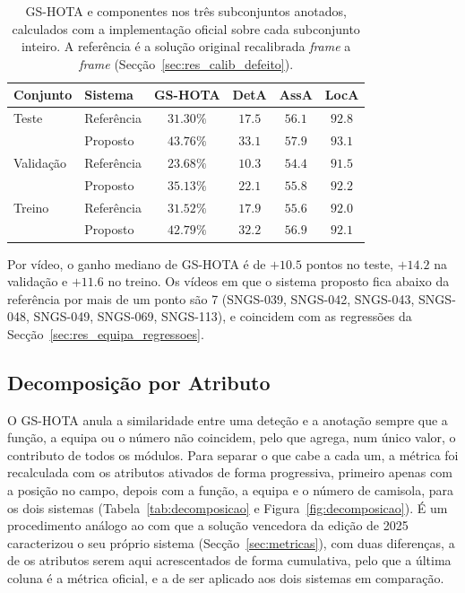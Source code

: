 \begin{table}[htbp]
    \centering
    \caption{GS-HOTA e componentes nos três subconjuntos anotados, calculados com a implementação
    oficial sobre cada subconjunto inteiro. A referência é a solução original recalibrada
    \emph{frame} a \emph{frame} (Secção~\ref{sec:res_calib_defeito}).}
    \label{tab:gshota}
    \begin{tabular}{|l|l|c|c|c|c|}
        \hline
        \textbf{Conjunto} & \textbf{Sistema} & \textbf{GS-HOTA} & \textbf{DetA} & \textbf{AssA} & \textbf{LocA} \\
        \hline
        Teste & Referência & $31.30\%$ & $17.5$ & $56.1$ & $92.8$ \\
        \hline
         & Proposto & $43.76\%$ & $33.1$ & $57.9$ & $93.1$ \\
        \hline
        Validação & Referência & $23.68\%$ & $10.3$ & $54.4$ & $91.5$ \\
        \hline
         & Proposto & $35.13\%$ & $22.1$ & $55.8$ & $92.2$ \\
        \hline
        Treino & Referência & $31.52\%$ & $17.9$ & $55.6$ & $92.0$ \\
        \hline
         & Proposto & $42.79\%$ & $32.2$ & $56.9$ & $92.1$ \\
        \hline
    \end{tabular}
\end{table}

Por vídeo, o ganho mediano de GS-HOTA é de $+10.5$ pontos no teste, $+14.2$ na
validação e $+11.6$ no treino. Os vídeos em que o sistema proposto fica abaixo da referência
por mais de um ponto são 7 (SNGS-039, SNGS-042, SNGS-043, SNGS-048, SNGS-049, SNGS-069, SNGS-113), e coincidem com as regressões da
Secção~\ref{sec:res_equipa_regressoes}.

\subsection{Decomposição por Atributo}\label{sec:res_decomposicao}

O GS-HOTA anula a similaridade entre uma deteção e a anotação sempre que a função, a equipa ou o
número não coincidem, pelo que agrega, num único valor, o contributo de todos os módulos. Para
separar o que cabe a cada um, a métrica foi recalculada com os atributos ativados de forma
progressiva, primeiro apenas com a posição no campo, depois com a função, a equipa e o número de
camisola, para os dois sistemas (Tabela~\ref{tab:decomposicao} e Figura~\ref{fig:decomposicao}).
É um procedimento análogo ao com que a solução vencedora da edição de 2025 caracterizou o seu
próprio sistema (Secção~\ref{sec:metricas}), com duas diferenças, a de os atributos serem aqui
acrescentados de forma cumulativa, pelo que a última coluna é a métrica oficial, e a de ser aplicado
aos dois sistemas em comparação.

